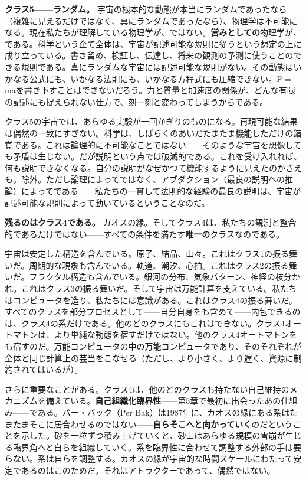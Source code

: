\documentclass[11pt, twoside, openright]{book}
\begin{document}
\textbf{クラス5------ランダム。} 宇宙の根本的な動態が本当にランダムであったなら（複雑に見えるだけではなく、真にランダムであったなら）、物理学は不可能になる。現在私たちが理解している物理学が、ではない。\textbf{営みとしての}物理学が、である。科学という企て全体は、宇宙が記述可能な規則に従うという想定の上に成り立っている。書き留め、検証し、伝達し、将来の観測の予測に使うことのできる規則である。真にランダムな宇宙には記述可能な規則がない。その動態はいかなる公式にも、いかなる法則にも、いかなる方程式にも圧縮できない。F = maを書き下すことはできないだろう。力と質量と加速度の関係が、どんな有限の記述にも捉えられない仕方で、刻一刻と変わってしまうからである。

クラス5の宇宙では、あらゆる実験が一回かぎりのものになる。再現可能な結果は偶然の一致にすぎない。科学は、しばらくのあいだたまたま機能しただけの錯覚である。これは論理的に不可能なことではない------そのような宇宙を想像しても矛盾は生じない。だが説明という点では破滅的である。これを受け入れれば、何も説明できなくなる。自分の説明がなぜかつて機能するように見えたのかさえも。除外。ただし論理によってではなく、アブダクション（最良の説明への推論）によってである------私たちの一貫して法則的な経験の最良の説明は、宇宙が記述可能な規則によって動いているということなのだ。

\textbf{残るのはクラス4である。} カオスの縁。そしてクラス4は、私たちの観測と整合的であるだけではない------すべての条件を満たす\textbf{唯一の}クラスなのである。

宇宙は安定した構造を含んでいる。原子、結晶、山々。これはクラス1の振る舞いだ。周期的な現象も含んでいる。軌道、潮汐、心拍。これはクラス2の振る舞いだ。フラクタル構造も含んでいる。銀河の分布、気象パターン、神経の枝分かれ。これはクラス3の振る舞いだ。そして宇宙は万能計算を支えている。私たちはコンピュータを造り、私たちには意識がある。これはクラス4の振る舞いだ。すべてのクラスを部分プロセスとして------自分自身をも含めて------内包できるのは、クラス4の系だけである。他のどのクラスにもこれはできない。クラス4オートマトンは、より単純な動態を宿すだけではない。他のクラス4オートマトンをも宿すのだ。万能コンピュータの中の万能コンピュータであり、そのそれぞれが全体と同じ計算上の芸当をこなせる（ただし、より小さく、より遅く、資源に制約されてはいるが）。

さらに重要なことがある。クラス4は、他のどのクラスも持たない自己維持のメカニズムを備えている。\textbf{自己組織化臨界性}------第5章で最初に出会ったあの仕組み------である。パー・バック（Per Bak）は1987年に、カオスの縁にある系はたまたまそこに居合わせるのではない------\textbf{自らそこへと向かっていく}のだということを示した。砂を一粒ずつ積み上げていくと、砂山はあらゆる規模の雪崩が生じる臨界角へと自らを組織していく。系を臨界性に合わせて調整する外部の手は要らない。系は自らを調整する。カオスの縁が宇宙的な時間スケールにわたって安定であるのはこのためだ。それはアトラクターであって、偶然ではない。
\end{document}
